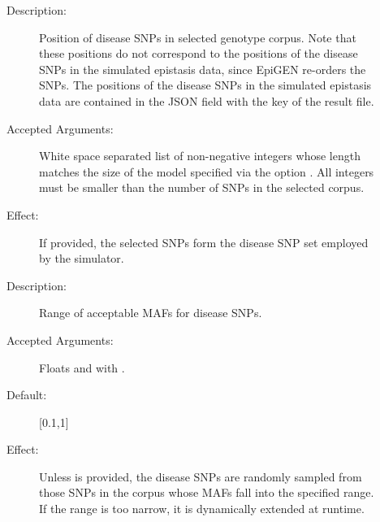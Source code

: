 \documentclass[a4paper,10pt,english]{sphinxhowto}
\begin{document}
\begin{description}
\begin{description}
\begin{description}
\end{description}

\end{description}

\item[{\sphinxstylestrong{Optional Mutually Exclusive Arguments:}}] \leavevmode\begin{description}
\item[{}] \leavevmode\begin{description}
\item[{Description:}] \leavevmode
Position of disease SNPs in selected genotype corpus. Note that these positions do not correspond to the
positions of the disease SNPs in the simulated epistasis data, since EpiGEN re-orders the SNPs. The
positions of the disease SNPs in the simulated epistasis data are contained in the JSON field
with the key  of the result file.

\item[{Accepted Arguments:}] \leavevmode
White space separated list of non-negative integers whose length matches the size of the model specified
via the option . All integers must be smaller than the number of SNPs in the selected corpus.

\item[{Effect:}] \leavevmode
If provided, the selected SNPs form the disease SNP set employed by the simulator.

\end{description}

\item[{}] \leavevmode\begin{description}
\item[{Description:}] \leavevmode
Range of acceptable MAFs for disease SNPs.

\item[{Accepted Arguments:}] \leavevmode
Floats  and  with .

\item[{Default:}] \leavevmode
{[}0.1,1{]}

\item[{Effect:}] \leavevmode
Unless  is provided, the disease SNPs are randomly sampled from those SNPs in the corpus whose MAFs
fall into the specified range. If the range is too narrow, it is dynamically extended at runtime.


\end{description}
\end{description}
\end{description}
\end{document}
